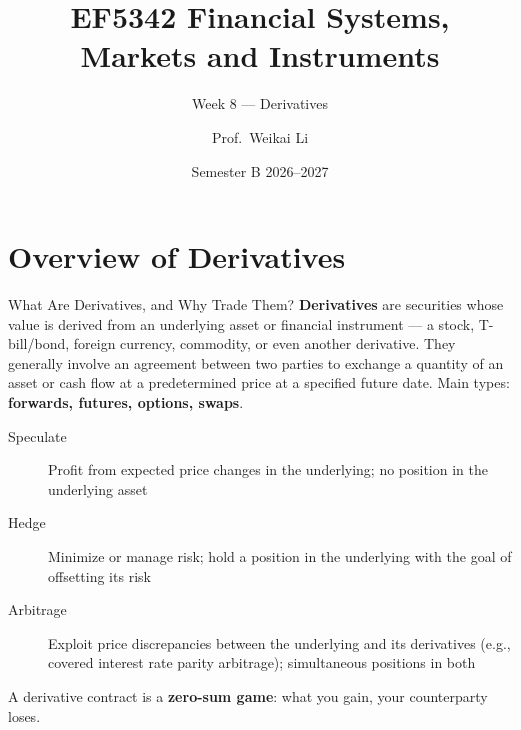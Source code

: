 \documentclass[aspectratio=169]{beamer}
\title{EF5342 Financial Systems, Markets and Instruments}
\subtitle{Week 8 --- Derivatives}
\author{Prof.\ Weikai Li}
\institute{City University of Hong Kong}
\date{Semester B 2026--2027}
\begin{document}
\begin{frame}
\titlepage
\end{frame}

\section{Overview of Derivatives}

\begin{frame}{What Are Derivatives, and Why Trade Them?}
\textbf{Derivatives} are securities whose value is derived from an underlying asset or financial instrument --- a stock, T-bill/bond, foreign currency, commodity, or even another derivative. They generally involve an agreement between two parties to exchange a quantity of an asset or cash flow at a predetermined price at a specified future date. Main types: \textbf{forwards, futures, options, swaps}.
\vspace{0.3em}
\begin{description}
  \item[Speculate] Profit from expected price changes in the underlying; no position in the underlying asset
  \item[Hedge] Minimize or manage risk; hold a position in the underlying with the goal of offsetting its risk
  \item[Arbitrage] Exploit price discrepancies between the underlying and its derivatives (e.g., covered interest rate parity arbitrage); simultaneous positions in both
\end{description}
\vspace{0.3em}
A derivative contract is a \textbf{zero-sum game}: what you gain, your counterparty loses.
\end{frame}
\end{document}
